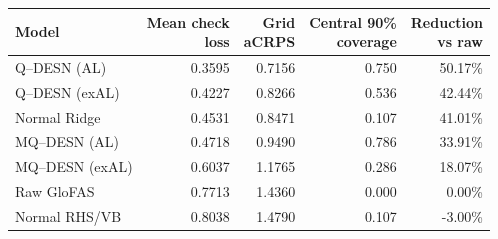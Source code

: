 \begin{tabular*}{\linewidth}{@{\extracolsep{\fill}}lrrrr@{}}
\toprule
Model & \shortstack{Mean check\\loss} & \shortstack{Grid\\aCRPS} & \shortstack{Central 90\%\\coverage} & \shortstack{Reduction\\vs raw} \\
\midrule
Q--DESN (AL) & 0.3595 & 0.7156 & 0.750 & 50.17\% \\
Q--DESN (exAL) & 0.4227 & 0.8266 & 0.536 & 42.44\% \\
Normal Ridge & 0.4531 & 0.8471 & 0.107 & 41.01\% \\
MQ--DESN (AL) & 0.4718 & 0.9490 & 0.786 & 33.91\% \\
MQ--DESN (exAL) & 0.6037 & 1.1765 & 0.286 & 18.07\% \\
Raw GloFAS & 0.7713 & 1.4360 & 0.000 & 0.00\% \\
Normal RHS/VB & 0.8038 & 1.4790 & 0.107 & -3.00\% \\
\bottomrule
\end{tabular*}
